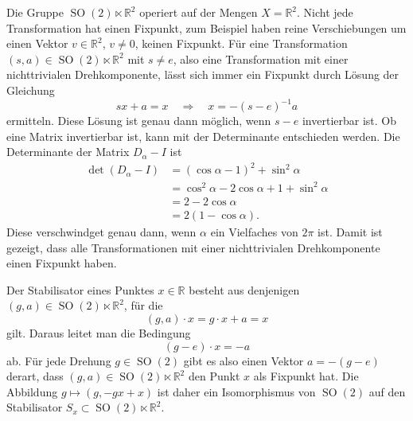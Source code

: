 \begin{beispiel}
\label{buch:nichtkomm:homogen:bsp:SO3}
Die Gruppe $\operatorname{SO}(2)\ltimes\mathbb{R}^2$ operiert auf der
Mengen $X=\mathbb{R}^2$.
Nicht jede Transformation hat einen Fixpunkt, zum Beispiel haben reine
Verschiebungen um einen Vektor $v\in\mathbb{R}^2$, $v\ne 0$, keinen
Fixpunkt.
Für eine Transformation $(s,a)\in\operatorname{SO}(2)\ltimes \mathbb{R}^2$
mit $s\ne e$, also eine Transformation mit einer nichttrivialen
Drehkomponente, lässt sich immer ein Fixpunkt durch Lösung der 
Gleichung
\[
sx+a=x
\quad\Rightarrow\quad
x = -(s-e)^{-1}a
\]
ermitteln.
Diese Lösung ist genau dann möglich, wenn $s-e$ invertierbar ist.
Ob eine Matrix invertierbar ist,
kann mit der Determinante entschieden werden.
Die Determinante der Matrix $D_\alpha-I$ ist
\begin{align*}
\det(D_\alpha-I)
&=
(\cos\alpha-1)^2+\sin^2\alpha
\\
&=
\cos^2\alpha-2\cos\alpha +1+\sin^2\alpha
\\
&=
2-2\cos\alpha 
\\
&=
2(1-\cos\alpha).
\end{align*}
Diese verschwindget genau dann, wenn $\alpha$ ein Vielfaches von $2\pi$ ist.
Damit ist gezeigt, dass alle Transformationen mit einer nichttrivialen
Drehkomponente einen Fixpunkt haben.

Der Stabilisator eines Punktes $x\in\mathbb{R}$ besteht aus denjenigen
$(g,a)\in\operatorname{SO}(2)\ltimes \mathbb{R}^2$, für die
\[
(g,a)\cdot x = g\cdot x+a = x
\]
gilt.
Daraus leitet man die Bedingung 
\[
(g-e)\cdot x = -a
\]
ab.
Für jede Drehung $g\in\operatorname{SO}(2)$ gibt es also einen Vektor
$a=-(g-e)$ derart, dass $(g,a)\in\operatorname{SO}(2)\ltimes\mathbb{R}^2$
den Punkt $x$ als Fixpunkt hat.
Die Abbildung $g\mapsto(g,-gx+x)$ ist daher ein Isomorphismus von
$\operatorname{SO}(2)$ auf den Stabilisator
$S_x\subset \operatorname{SO}(2)\ltimes \mathbb{R}^2$.
\end{beispiel}


